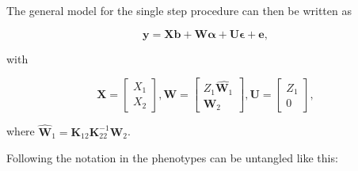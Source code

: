 \documentclass[12pt,titlepage]{article}
\begin{document}
The general model for the single step procedure can then be written as 

\begin{equation} \label{eq:single-step-model}
\mathbf{y} = \mathbf{Xb} + \mathbf{W} \boldsymbol{\alpha} + \mathbf{U} \boldsymbol{\epsilon} + \mathbf{e},
\end{equation}

with

\begin{equation} \label{eq:single-step-submatrices}
\mathbf{X} = 
\begin{bmatrix}
  X_1 \\
  X_2 
 \end{bmatrix},
 \mathbf{W} = 
\begin{bmatrix}
  Z_1\hat{\mathbf{W}_1} \\
  \mathbf{W}_2 
 \end{bmatrix},
 \mathbf{U} = 
\begin{bmatrix}
  Z_1 \\
  0 
 \end{bmatrix},
\end{equation}

where $\hat{\mathbf{W}}_{1} = \mathbf{K}_{12} \mathbf{K}_{22}^{-1} \mathbf{W}_{2}$.

Following the notation in  the phenotypes can be untangled 
like this:
\end{document}
